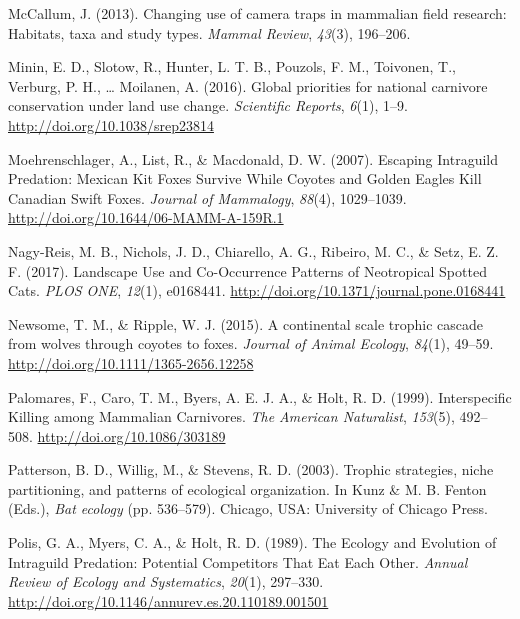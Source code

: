 \documentclass[12pt,twoside]{reedthesis}
\begin{document}
\leavevmode\hypertarget{ref-mccallum_changing_2013}{}%
McCallum, J. (2013). Changing use of camera traps in mammalian field research: Habitats, taxa and study types. \emph{Mammal Review}, \emph{43}(3), 196--206.

\leavevmode\hypertarget{ref-minin_global_2016}{}%
Minin, E. D., Slotow, R., Hunter, L. T. B., Pouzols, F. M., Toivonen, T., Verburg, P. H., \ldots{} Moilanen, A. (2016). Global priorities for national carnivore conservation under land use change. \emph{Scientific Reports}, \emph{6}(1), 1--9. \url{http://doi.org/10.1038/srep23814}

\leavevmode\hypertarget{ref-moehrenschlager_escaping_2007}{}%
Moehrenschlager, A., List, R., \& Macdonald, D. W. (2007). Escaping Intraguild Predation: Mexican Kit Foxes Survive While Coyotes and Golden Eagles Kill Canadian Swift Foxes. \emph{Journal of Mammalogy}, \emph{88}(4), 1029--1039. \url{http://doi.org/10.1644/06-MAMM-A-159R.1}

\leavevmode\hypertarget{ref-nagy-reis_landscape_2017}{}%
Nagy-Reis, M. B., Nichols, J. D., Chiarello, A. G., Ribeiro, M. C., \& Setz, E. Z. F. (2017). Landscape Use and Co-Occurrence Patterns of Neotropical Spotted Cats. \emph{PLOS ONE}, \emph{12}(1), e0168441. \url{http://doi.org/10.1371/journal.pone.0168441}

\leavevmode\hypertarget{ref-newsome_continental_2015}{}%
Newsome, T. M., \& Ripple, W. J. (2015). A continental scale trophic cascade from wolves through coyotes to foxes. \emph{Journal of Animal Ecology}, \emph{84}(1), 49--59. \url{http://doi.org/10.1111/1365-2656.12258}

\leavevmode\hypertarget{ref-palomares_interspecific_1999}{}%
Palomares, F., Caro, T. M., Byers, A. E. J. A., \& Holt, R. D. (1999). Interspecific Killing among Mammalian Carnivores. \emph{The American Naturalist}, \emph{153}(5), 492--508. \url{http://doi.org/10.1086/303189}

\leavevmode\hypertarget{ref-patterson_trophic_2003}{}%
Patterson, B. D., Willig, M., \& Stevens, R. D. (2003). Trophic strategies, niche partitioning, and patterns of ecological organization. In Kunz \& M. B. Fenton (Eds.), \emph{Bat ecology} (pp. 536--579). Chicago, USA: University of Chicago Press.

\leavevmode\hypertarget{ref-polis_ecology_1989}{}%
Polis, G. A., Myers, C. A., \& Holt, R. D. (1989). The Ecology and Evolution of Intraguild Predation: Potential Competitors That Eat Each Other. \emph{Annual Review of Ecology and Systematics}, \emph{20}(1), 297--330. \url{http://doi.org/10.1146/annurev.es.20.110189.001501}
\end{document}
